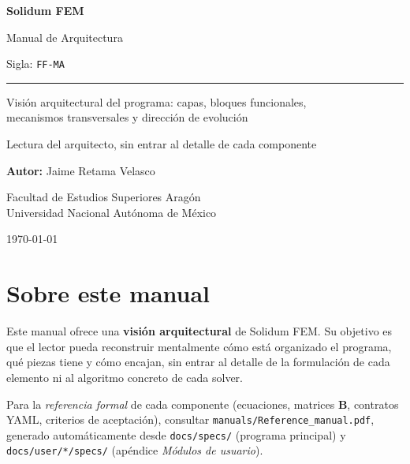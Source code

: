 \documentclass[11pt,oneside]{report}
\begin{document}

\begin{titlepage}
    \centering
    \vspace*{2cm}
    {\Huge\bfseries\color{yamlkey} Solidum FEM \par}
    \vspace{1cm}
    {\LARGE Manual de Arquitectura \par}
    \vspace{0.3cm}
    {\normalsize\color{darkgray} Sigla: \texttt{FF-MA} \par}
    \vspace{0.5cm}
    \rule{\linewidth}{0.5mm} \par
    \vspace{2cm}
    {\large Visión arquitectural del programa: capas, bloques funcionales,\\
            mecanismos transversales y dirección de evolución\par}
    \vspace{2cm}
    {\large Lectura del arquitecto, sin entrar al detalle de cada componente\par}
    \vspace{1cm}
    {\Large \textbf{Autor:} Jaime Retama Velasco \par}
    \vspace{0.5cm}
    {\large Facultad de Estudios Superiores Aragón \\ Universidad Nacional Autónoma de México \par}
    \vfill
    {\large \today \par}
\end{titlepage}

\setcounter{page}{1}
\tableofcontents
\newpage

\chapter*{Sobre este manual}
\noindent Este manual ofrece una \textbf{visión arquitectural} de Solidum FEM. Su objetivo es que el lector pueda reconstruir mentalmente cómo está organizado el programa, qué piezas tiene y cómo encajan, sin entrar al detalle de la formulación de cada elemento ni al algoritmo concreto de cada solver.

Para la \emph{referencia formal} de cada componente (ecuaciones, matrices $\mathbf B$, contratos YAML, criterios de aceptación), consultar \texttt{manuals/Reference\_manual.pdf}, generado automáticamente desde \texttt{docs/specs/} (programa principal) y \texttt{docs/user/*/specs/} (apéndice \emph{Módulos de usuario}).
\end{document}
